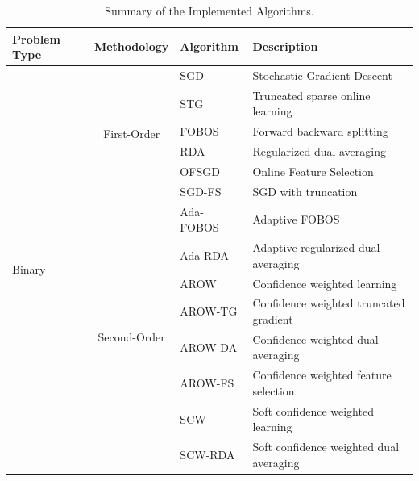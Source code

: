 \documentclass[11pt,a4paper]{article}
\begin{document}
\begin{table}[!htpb]
    \caption{Summary of the Implemented Algorithms.}
    \label{tab:summary-algorithms}
    \begin{small}
        \renewcommand{\arraystretch}{1.3}
        \begin{tabular}{l||c|l|l}
            \hline
            Problem Type   &  Methodology & Algorithm & Description \\\hline \hline
            \multirow{14}{*}{Binary} &\multirow{6}{*}{\footnotesize First-Order}
            & SGD & {\footnotesize Stochastic Gradient Descent~\cite{rosenblatt1958perceptron}} \\\cline{3-4}
            & & STG & {\footnotesize Truncated sparse online learning~\cite{langford2009sparse}} \\\cline{3-4}
            & &FOBOS & {\footnotesize Forward backward splitting~\cite{duchi2009efficient}}\\\cline{3-4}
            & &RDA & {\scriptsize Regularized dual averaging~\cite{xiao2010dual}} \\\cline{3-4}
            & &OFSGD & {\scriptsize Online Feature Selection~\cite{wang2013online}} \\\cline{3-4}
            & &SGD-FS& {\scriptsize SGD with truncation} \\\cline{2-4}
            &\multirow{8}{*}{\footnotesize Second-Order}
            &Ada-FOBOS & {\footnotesize Adaptive FOBOS~\cite{duchi2011adaptive}}\\\cline{3-4}
            & & Ada-RDA &Adaptive regularized dual averaging~\cite{duchi2011adaptive}\\\cline{3-4}
            & &AROW & Confidence weighted learning~\cite{crammer2009adaptive}\\\cline{3-4}
            Classification &&AROW-TG & Confidence weighted truncated gradient\\\cline{3-4}
            & &AROW-DA & Confidence weighted dual averaging\\\cline{3-4}
            & &AROW-FS & Confidence weighted feature selection\\\cline{3-4}
            & &SCW & Soft confidence weighted learning~\cite{wang2012exact}\\\cline{3-4}
            & &SCW-RDA & Soft confidence weighted dual averaging\\\cline{3-4}
            \hline
        \end{tabular}
    \end{small}
    \renewcommand{\arraystretch}{1}
\end{table}
\end{document}
